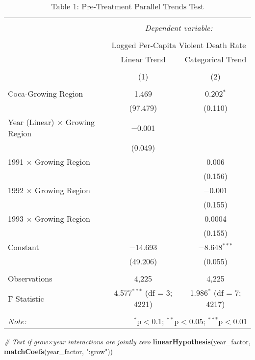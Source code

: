 \documentclass[
]{article}
\newenvironment{Shaded}{\begin{snugshade}}{\end{snugshade}}
\newcommand{\CommentTok}[1]{\textcolor[rgb]{0.56,0.35,0.01}{\textit{#1}}}
\newcommand{\FunctionTok}[1]{\textcolor[rgb]{0.13,0.29,0.53}{\textbf{#1}}}
\newcommand{\NormalTok}[1]{#1}
\newcommand{\StringTok}[1]{\textcolor[rgb]{0.31,0.60,0.02}{#1}}
\begin{document}
\begin{table}[!htbp] \centering 
  \caption{Table 1: Pre-Treatment Parallel Trends Test} 
  \label{} 
\begin{tabular}{@{\extracolsep{5pt}}lcc} 
\\[-1.8ex]\hline 
\hline \\[-1.8ex] 
 & \multicolumn{2}{c}{\textit{Dependent variable:}} \\ 
\cline{2-3} 
\\[-1.8ex] & \multicolumn{2}{c}{Logged Per-Capita Violent Death Rate} \\ 
 & Linear Trend & Categorical Trend \\ 
\\[-1.8ex] & (1) & (2)\\ 
\hline \\[-1.8ex] 
 Coca-Growing Region & 1.469 & 0.202$^{*}$ \\ 
  & (97.479) & (0.110) \\ 
  Year (Linear) $\times$ Growing Region & $-$0.001 &  \\ 
  & (0.049) &  \\ 
  1991 $\times$ Growing Region &  & 0.006 \\ 
  &  & (0.156) \\ 
  1992 $\times$ Growing Region &  & $-$0.001 \\ 
  &  & (0.155) \\ 
  1993 $\times$ Growing Region &  & 0.0004 \\ 
  &  & (0.155) \\ 
  Constant & $-$14.693 & $-$8.648$^{***}$ \\ 
  & (49.206) & (0.055) \\ 
 \hline \\[-1.8ex] 
Observations & 4,225 & 4,225 \\ 
F Statistic & 4.577$^{***}$ (df = 3; 4221) & 1.986$^{*}$ (df = 7; 4217) \\ 
\hline 
\hline \\[-1.8ex] 
\textit{Note:}  & \multicolumn{2}{r}{$^{*}$p$<$0.1; $^{**}$p$<$0.05; $^{***}$p$<$0.01} \\ 
\end{tabular} 
\end{table}

\begin{Shaded}
\begin{Highlighting}[]
\CommentTok{\# Test if grow×year interactions are jointly zero}
\FunctionTok{linearHypothesis}\NormalTok{(year\_factor, }\FunctionTok{matchCoefs}\NormalTok{(year\_factor, }\StringTok{":grow"}\NormalTok{))}
\end{Highlighting}
\end{Shaded}
\end{document}

